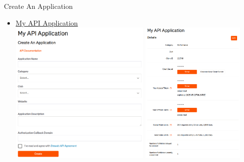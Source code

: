 \begin{frame}{Create An Application}
\begin{itemize}
\item \href{https://www.strava.com/settings/api}{My API Application}\\
\includegraphics[height=7cm]{createAPI.png}
\includegraphics[height=7cm]{createAPI2.png}
\end{itemize}
\end{frame}

